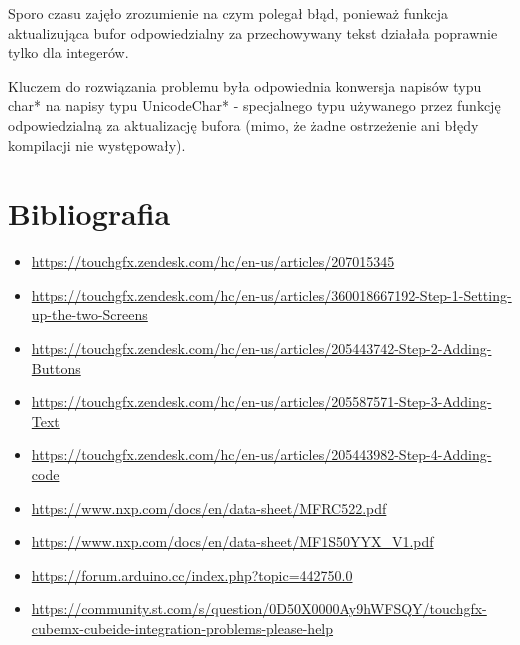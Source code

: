\documentclass[12pt,hidelinks]{article}
\begin{document}
    \vskip 0.2in

    Sporo czasu zajęło zrozumienie na czym polegał błąd, ponieważ funkcja aktualizująca bufor odpowiedzialny za przechowywany tekst działała poprawnie tylko dla integerów.

    \vskip 0.2in

    Kluczem do rozwiązania problemu była odpowiednia konwersja napisów typu char* na napisy typu UnicodeChar* - specjalnego typu używanego przez funkcję odpowiedzialną za aktualizację bufora (mimo, że żadne ostrzeżenie ani błędy kompilacji nie występowały).
    
    
    \section{Bibliografia}
    \vspace{10.5cm}
 \begin{itemize}
    
\item \url{https://touchgfx.zendesk.com/hc/en-us/articles/207015345}
    
\item \url{https://touchgfx.zendesk.com/hc/en-us/articles/360018667192-Step-1-Setting-up-the-two-Screens}
    
    \item \url{https://touchgfx.zendesk.com/hc/en-us/articles/205443742-Step-2-Adding-Buttons}
    
    \item \url{https://touchgfx.zendesk.com/hc/en-us/articles/205587571-Step-3-Adding-Text}

    \item \url{https://touchgfx.zendesk.com/hc/en-us/articles/205443982-Step-4-Adding-code}

    \item \url{https://www.nxp.com/docs/en/data-sheet/MFRC522.pdf}
    
    \item \url{https://www.nxp.com/docs/en/data-sheet/MF1S50YYX_V1.pdf}
    
    \item \url{https://forum.arduino.cc/index.php?topic=442750.0}
    
    \item \url{https://community.st.com/s/question/0D50X0000Ay9hWFSQY/touchgfx-cubemx-cubeide-integration-problems-please-help}
 \end{itemize}
\end{document}
